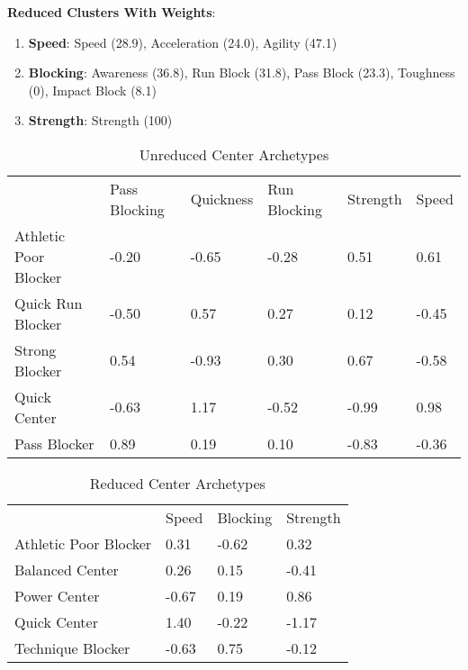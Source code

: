 \documentclass[11pt]{article}
\begin{document}
\textbf{Reduced Clusters With Weights}:

\begin{enumerate}
\item{\textbf{Speed}}: Speed (28.9), Acceleration (24.0), Agility (47.1)
\item{\textbf{Blocking}}: Awareness (36.8), Run Block (31.8), Pass Block (23.3), Toughness (0), Impact Block (8.1)
\item{\textbf{Strength}}: Strength (100)
\end{enumerate}

\begin{table}[]
\centering
\caption{Unreduced Center Archetypes}
\label{UnreducedCenter}
\begin{tabular}{llllll}
                      & Pass Blocking & Quickness & Run Blocking & Strength & Speed \\
Athletic Poor Blocker & -0.20         & -0.65     & -0.28        & 0.51     & 0.61  \\
Quick Run Blocker     & -0.50         & 0.57      & 0.27         & 0.12     & -0.45 \\
Strong Blocker        & 0.54          & -0.93     & 0.30         & 0.67     & -0.58 \\
Quick Center          & -0.63         & 1.17      & -0.52        & -0.99    & 0.98  \\
Pass Blocker          & 0.89          & 0.19      & 0.10         & -0.83    & -0.36
\end{tabular}
\end{table}

\begin{table}[]
\centering
\caption{Reduced Center Archetypes}
\label{ReducedCenter}
\begin{tabular}{llll}
                      & Speed & Blocking & Strength \\
Athletic Poor Blocker & 0.31  & -0.62    & 0.32     \\
Balanced Center       & 0.26  & 0.15     & -0.41    \\
Power Center          & -0.67 & 0.19     & 0.86     \\
Quick Center          & 1.40  & -0.22    & -1.17    \\
Technique Blocker     & -0.63 & 0.75     & -0.12   
\end{tabular}
\end{table}
\end{document}
